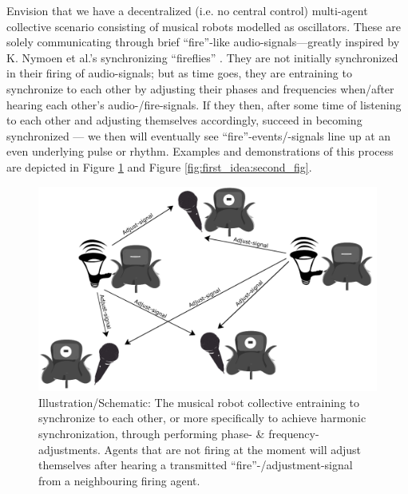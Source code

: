 	Envision that we have a decentralized (i.e. no central control) multi-agent collective scenario consisting of musical robots modelled as oscillators. These are solely communicating through brief ``fire''-like audio-signals—greatly inspired by K. Nymoen et al.'s synchronizing ``fireflies'' \cite{nymoen_synch}. They are not initially synchronized in their firing of audio-signals; but as time goes, they are entraining to synchronize to each other by adjusting their phases and frequencies when/after hearing each other's audio-/fire-signals. If they then, after some time of listening to each other and adjusting themselves accordingly, succeed in becoming synchronized — we then will eventually see ``fire''-events/-signals line up at an even underlying pulse or rhythm. Examples and demonstrations of this process are depicted in Figure \ref{fig:first_idea:first_fig} and Figure \ref{fig:first_idea:second_fig}.

	\begin{figure}[h]
	\centering
	\includegraphics[width=0.9\linewidth]{Assets/Figures/schematic_initial_idea.pdf}
	\caption[Illustration/schematic of the developed multi musical robot collective/system]{Illustration/Schematic: The musical robot collective entraining to synchronize to each other, or more specifically to achieve harmonic synchronization, through performing phase- \& frequency-adjustments. Agents that are not firing at the moment will adjust themselves after hearing a transmitted ``fire''-/adjustment-signal from a neighbouring firing agent.}
	\label{fig:first_idea:first_fig}
	\end{figure}

